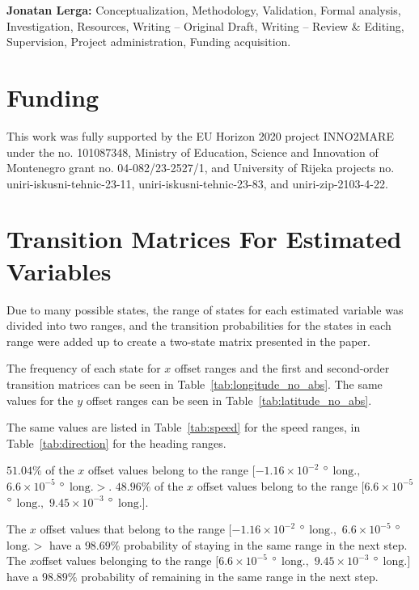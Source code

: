 \documentclass[preprint,12pt]{elsarticle}
\begin{document}
\textbf{Jonatan Lerga:} Conceptualization, Methodology, Validation, Formal analysis, Investigation, Resources, Writing -- Original Draft, Writing -- Review \& Editing, Supervision, Project administration, Funding acquisition.

\section*{Funding}
This work was fully supported by the EU Horizon 2020 project INNO2MARE under the no. 101087348, Ministry of Education, Science and Innovation of Montenegro grant no. 04-082/23-2527/1, and University of Rijeka projects no. uniri-iskusni-tehnic-23-11, uniri-iskusni-tehnic-23-83, and uniri-zip-2103-4-22.

\appendix
\section{Transition Matrices For Estimated Variables}
\label{sec:Transition}

Due to many possible states, the range of states for each estimated variable was divided into two ranges, and the transition probabilities for the states in each range were added up to create a two-state matrix presented in the paper.

The frequency of each state for $x$ offset ranges and the first and second-order transition matrices can be seen in Table~\ref{tab:longitude_no_abs}. The same values for the $y$ offset ranges can be seen in Table~\ref{tab:latitude_no_abs}.

The same values are listed in Table~\ref{tab:speed} for the speed ranges, in Table~\ref{tab:direction} for the heading ranges.

$51.04\%$ of the $x$ offset values belong to the range $[-1.16 \times 10^{-2}$ $\degree$ $\mathrm{long.},$ $6.6 \times 10^{-5}$ $\degree$ $\mathrm{long.}>$. $48.96\%$ of the $x$ offset values belong to the range $[6.6 \times 10^{-5}$ $\degree$ $\mathrm{long.},$ $9.45 \times 10^{-3}$ $\degree$ $\mathrm{long.}]$. 

The $x$ offset values that belong to the range $[-1.16 \times 10^{-2}$ $\degree$ $\mathrm{long.},$ $6.6 \times 10^{-5}$ $\degree$ $\mathrm{long.}>$ have a $98.69\%$ probability of staying in the same range in the next step. The $x$offset values belonging to the range $[6.6 \times 10^{-5}$ $\degree$ $\mathrm{long.},$ $9.45 \times 10^{-3}$ $\degree$ $\mathrm{long.}]$ have a $98.89\%$ probability of remaining in the same range in the next step.
\end{document}
